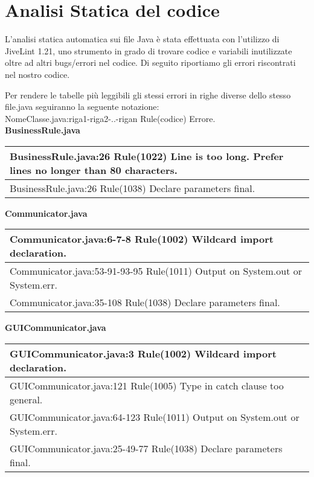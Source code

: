 \chapter{Analisi Statica del codice}

L'analisi statica automatica sui file Java \`e stata effettuata con l'utilizzo di JiveLint 1.21, uno strumento in grado di trovare codice e variabili inutilizzate oltre ad altri bugs/errori nel codice.
Di seguito riportiamo gli errori riscontrati nel nostro codice.

Per rendere le tabelle pi\`u leggibili gli stessi errori in righe diverse dello stesso file.java seguiranno la seguente notazione: \\
NomeClasse.java:riga1-riga2-..-rigan Rule(codice) Errore. \\

\textbf{BusinessRule.java}
\begin{center}
\begin{tabular}{|p{12cm}|} \hline
BusinessRule.java:26 Rule(1022) Line is too long. Prefer lines no longer than 80 characters. \\ \hline
BusinessRule.java:26 Rule(1038) Declare parameters final. \\ \hline
\end{tabular}
\end{center}

\textbf{Communicator.java}
\begin{center}
\begin{tabular}{|p{12cm}|} \hline
Communicator.java:6-7-8 Rule(1002) Wildcard import declaration. \\ \hline
Communicator.java:53-91-93-95 Rule(1011) Output on System.out or System.err. \\ \hline
Communicator.java:35-108 Rule(1038) Declare parameters final. \\ \hline
\end{tabular}
\end{center}

\textbf{GUICommunicator.java}
\begin{center}
\begin{tabular}{|p{12cm}|} \hline
GUICommunicator.java:3 Rule(1002) Wildcard import declaration. \\ \hline
GUICommunicator.java:121 Rule(1005) Type in catch clause too general. \\ \hline
GUICommunicator.java:64-123 Rule(1011) Output on System.out or System.err. \\ \hline
GUICommunicator.java:25-49-77 Rule(1038) Declare parameters final. \\ \hline
\end{tabular}
\end{center}

